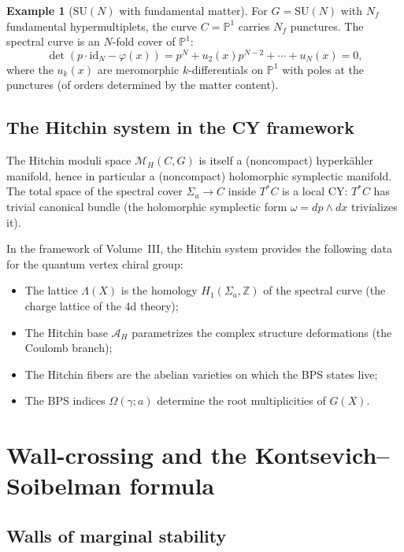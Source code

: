 \documentclass[11pt]{article}
\theoremstyle{definition}
\newtheorem{example}[theorem]{Example}
\theoremstyle{remark}
\newcommand{\cA}{\mathcal{A}}
\newcommand{\cM}{\mathcal{M}}
\newcommand{\id}{\mathrm{id}}
\newcommand{\SU}{\mathrm{SU}}
\begin{document}
\begin{example}[$\SU(N)$ with fundamental matter]
 \label{ex:su-n-fund}
 For $G = \SU(N)$ with $N_f$ fundamental hypermultiplets, the curve $C = \mathbb{P}^1$ carries
 $N_f$ punctures. The spectral curve is an $N$-fold cover of $\mathbb{P}^1$:
 \begin{equation}
 \label{eq:sw-curve-sun}
 \det(p \cdot \id_N - \varphi(x)) = p^N + u_2(x) p^{N-2} + \cdots + u_N(x) = 0,
 \end{equation}
 where the $u_k(x)$ are meromorphic $k$-differentials on $\mathbb{P}^1$ with poles at the punctures
 (of orders determined by the matter content).
\end{example}

\subsection{The Hitchin system in the CY framework}
\label{subsec:hitchin-cy}

The Hitchin moduli space $\cM_H(C, G)$ is itself a (noncompact) hyperk\"ahler manifold, hence
in particular a (noncompact) holomorphic symplectic manifold. The total space of the spectral
cover $\Sigma_a \to C$ inside $T^*C$ is a local CY: $T^*C$ has trivial canonical bundle (the
holomorphic symplectic form $\omega = dp \wedge dx$ trivializes it).

In the framework of Volume~III, the Hitchin system provides the following data for the quantum
vertex chiral group:
\begin{itemize}[nosep]
 \item The lattice $\Lambda(X)$ is the homology $H_1(\Sigma_a, \mathbb{Z})$ of the spectral curve
 (the charge lattice of the 4d theory);
 \item The Hitchin base $\cA_H$ parametrizes the complex structure deformations (the Coulomb branch);
 \item The Hitchin fibers are the abelian varieties on which the BPS states live;
 \item The BPS indices $\Omega(\gamma; a)$ determine the root multiplicities of $G(X)$.
\end{itemize}


\section{Wall-crossing and the Kontsevich--Soibelman formula}
\label{sec:wall-crossing}

\subsection{Walls of marginal stability}
\label{subsec:walls}
\end{document}
